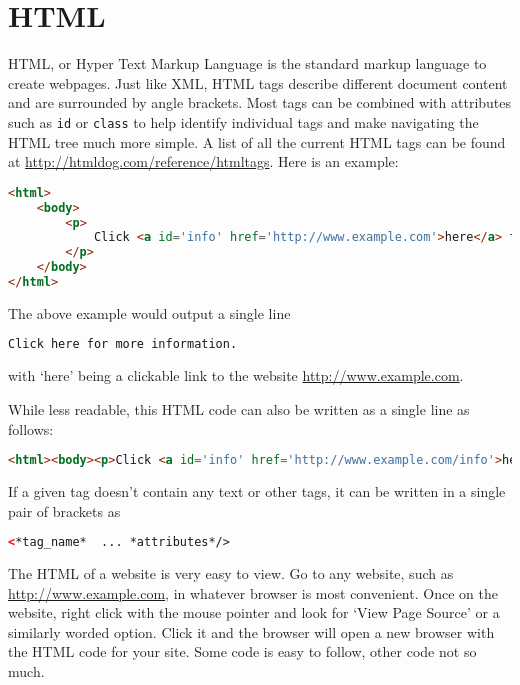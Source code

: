 \label{lab:BS_scraping}

\section*{HTML}
HTML, or Hyper Text Markup Language is the standard markup language to create webpages.
Just like XML, HTML tags describe different document content and are surrounded by angle brackets.
Most tags can be combined with attributes such as \lstinline[language=html]{id} or \lstinline[language=html]{class} to help identify individual tags and make navigating the HTML tree much more simple.
A list of all the current HTML tags can be found at \url{http://htmldog.com/reference/htmltags}.
Here is an example:
\begin{lstlisting}[language=HTML]
<html>
    <body>
        <p>
            Click <a id='info' href='http://www.example.com'>here</a> for more information.
        </p>
    </body>
</html>
\end{lstlisting}

The above example would output a single line
\begin{lstlisting}[language=HTML]
Click here for more information.
\end{lstlisting}
with `here' being a clickable link to the website \url{http://www.example.com}.

While less readable, this HTML code can also be written as a single line as follows:
\begin{lstlisting}[language=HTML]
<html><body><p>Click <a id='info' href='http://www.example.com/info'>here</a> for more information.</p></body></html>
\end{lstlisting}
If a given tag doesn't contain any text or other tags, it can be written in a single pair of brackets as
\begin{lstlisting}[language=HTML]
<*tag_name*  ... *attributes*/>
\end{lstlisting}

The HTML of a website is very easy to view.
Go to any website, such as \url{http://www.example.com}, in whatever browser is most convenient.
Once on the website, right click with the mouse pointer and look for `View Page Source' or a similarly worded option.
Click it and the browser will open a new browser with the HTML code for your site.
Some code is easy to follow, other code not so much.

